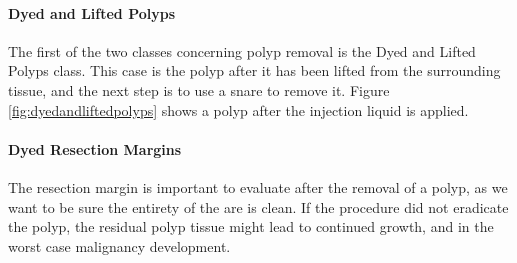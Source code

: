 \paragraph{Dyed and Lifted Polyps}
The first of the two classes concerning polyp removal is the Dyed and Lifted Polyps class. This case is the polyp after it has been lifted from the surrounding tissue, and the next step is to use a snare to remove it.
Figure \ref{fig:dyedandliftedpolyps} shows a polyp after the injection liquid is applied. 


\paragraph{Dyed Resection Margins}
The resection margin is important to evaluate after the removal of a polyp, as we want to be sure the entirety of the are is clean. 
If the procedure did not eradicate the polyp, the residual polyp tissue might lead to continued growth, and in the worst case malignancy development. 

    
\fi


